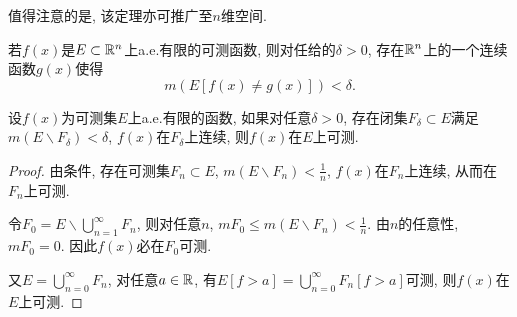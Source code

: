 \vskip 0.3cm
值得注意的是, 该定理亦可推广至$n$维空间. 
\begin{corollary}
	若$f(x)$是$E \subset \mathbb{R}^n$上a.e.有限的可测函数, 
	则对任给的$\delta > 0$, 存在$\mathbb{R}^n$上的一个连续函数$g(x)$使得
	$$
		m(E [ f(x) \neq g(x) ] ) < \delta. 
	$$
\end{corollary}

\vskip 0.3cm
\begin{theorem}[Лузин定理的逆定理]
	设$f(x)$为可测集$E$上a.e.有限的函数, 如果对任意$\delta > 0$, 存在闭集$F_{\delta} \subset E$满足$m(E\backslash F_{\delta}) < \delta$, $f(x)$在$F_{\delta}$上连续, 则$f(x)$在$E$上可测.
\end{theorem}
\begin{proof}
	由条件, 存在可测集$F_n \subset E$, $m(E \backslash F_n) < \frac 1n$, $f(x)$在$F_n$上连续, 从而在$F_n$上可测.
	
	令$F_0 = E \backslash \bigcup\limits_{n=1}^{\infty}F_n$, 则对任意$n$, $m F_0 \leq m(E \backslash F_n) < \frac 1n$. 
	由$n$的任意性, $m F_0 = 0$. 因此$f(x)$必在$F_0$可测.
	
	又$E = \bigcup\limits_{n=0}^{\infty}F_n$, 对任意$a \in \mathbb{R}$, 有$E[f>a] = \bigcup\limits_{n=0}^{\infty}F_n[f>a]$可测, 则$f(x)$在$E$上可测. 
\end{proof}





















